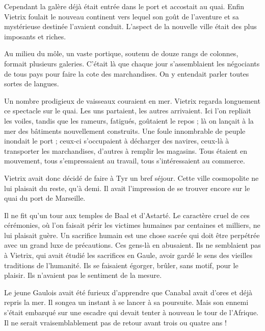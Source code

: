 \documentclass[a4paper, 11pt, oneside, polutonikogreek, french]{article}
\begin{document}
Cependant la galère déjà était entrée dans le port et accostait au quai. Enfin Vietrix foulait le nouveau continent vers lequel son goût de l'aventure et sa mystérieuse destinée l'avaient conduit. L'aspect de la nouvelle ville était des plus imposants et riches.

Au milieu du môle, un vaste portique, soutenu de douze rangs de colonnes, formait plusieurs galeries. C'était là que chaque jour s'assemblaient les négociants de tous pays pour faire la cote des marchandises. On y entendait parler toutes sortes de langues.

Un nombre prodigieux de vaisseaux couraient en mer. Vietrix regarda longuement ce spectacle sur le quai. Les uns partaient, les autres arrivaient. Ici l'on repliait les voiles, tandis que les rameurs, fatigués, goûtaient le repos ; là on lançait à la mer des bâtiments nouvellement construits. Une foule innombrable de peuple inondait le port ; ceux-ci s'occupaient à décharger des navires, ceux-là à transporter les marchandises, d'autres à remplir les magasins. Tous étaient en mouvement, tous s'empressaient au travail, tous s'intéressaient au commerce.

\bigskip
\centerline{\EightStarTaper}
\centerline{\EightStarTaper\EightStarTaper}
\bigskip

Vietrix avait donc décidé de faire à Tyr un bref séjour. Cette ville cosmopolite ne lui plaisait du reste, qu'à demi. Il avait l'impression de se trouver encore sur le quai du port de Marseille.

\bigskip
\centerline{\EightStarTaper}
\centerline{\EightStarTaper\EightStarTaper}
\bigskip

Il ne fit qu'un tour aux temples de Baal et d'Astarté. Le caractère cruel de ces cérémonies, où l'on faisait périr les victimes humaines par centaines et milliers, ne lui plaisait guère. Un sacrifice humain est une chose sacrée qui doit être perpétrée avec un grand luxe de précautions. Ces gens-là en abusaient. Ils ne semblaient pas à Vietrix, qui avait étudié les sacrifices en Gaule, avoir gardé le sens des vieilles traditions de l'humanité. Ils se faisaient égorger, brûler, sans motif, pour le plaisir. Ils n'avaient pas le sentiment de la mesure.

\bigskip
\centerline{\EightStarTaper}
\centerline{\EightStarTaper\EightStarTaper}
\bigskip

Le jeune Gaulois avait été furieux d'apprendre que Canabal avait d'ores et déjà repris la mer. Il songea un instant à se lancer à sa poursuite. Mais son ennemi s'était embarqué sur une escadre qui devait tenter à nouveau le tour de l'Afrique. Il ne serait vraisemblablement pas de retour avant trois ou quatre ans !
\end{document}
